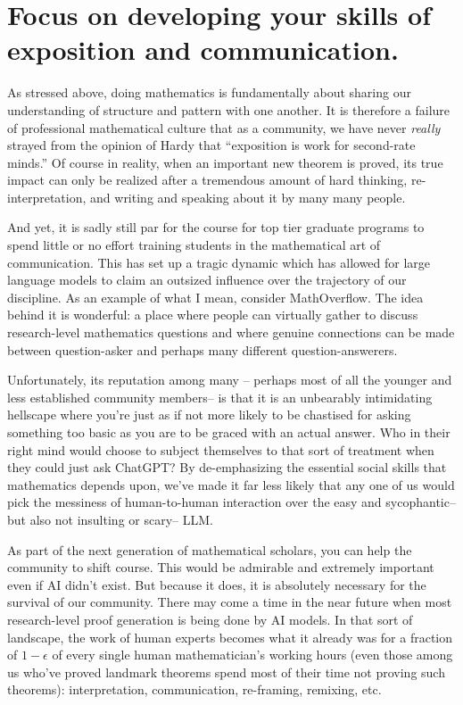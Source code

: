 \documentclass[11pt,reqno]{amsart}
\theoremstyle{plain}
\theoremstyle{definition}
\numberwithin{equation}{section}
\numberwithin{theorem}{section}
\begin{document}
\section{Focus on developing your skills of exposition and communication.
}

As stressed above, doing mathematics is fundamentally about sharing our understanding of structure and pattern with one another. It is therefore a  failure of professional mathematical culture that as a community, we have never \textit{really} strayed from the opinion of Hardy that ``exposition is work for second-rate minds.'' Of course in reality, when an important new theorem is proved, its true impact can only be realized after a tremendous amount of hard thinking, re-interpretation, and writing and speaking about it by many many people. 

And yet, it is sadly still par for the course for top tier graduate programs to spend little or no effort training students in the mathematical art of communication. This has set up a tragic dynamic which has allowed for large language models to claim an outsized influence over the trajectory of our discipline. As an example of what I mean, consider MathOverflow. The idea behind it is wonderful: a place where people can virtually gather to discuss research-level mathematics questions and where genuine connections can be made between question-asker and perhaps many different question-answerers. 


Unfortunately, its reputation among many – perhaps most of all the younger and less established community members– is that it is an unbearably intimidating hellscape where you’re just as if not more likely to be chastised for asking something too basic as you are to be graced with an actual answer. Who in their right mind would choose to subject themselves to that sort of treatment when they could just ask ChatGPT? By de-emphasizing the essential social skills that mathematics depends upon, we’ve made it far less likely that any one of us would pick the messiness of human-to-human interaction over the easy and sycophantic– but also not insulting or scary– LLM. 

As part of the next generation of mathematical scholars, you can help the community to shift course. This would be admirable and extremely important even if AI didn’t exist. But because it does, it is absolutely necessary for the survival of our community. There may come a time in the near future when most research-level proof generation is being done by AI models. In that sort of landscape, the work of human experts becomes what it already was for a fraction of $1-\epsilon$ of every single human mathematician’s working hours (even those among us who’ve proved landmark theorems spend most of their time not proving such theorems): interpretation, communication, re-framing, remixing, etc. 
\end{document}
